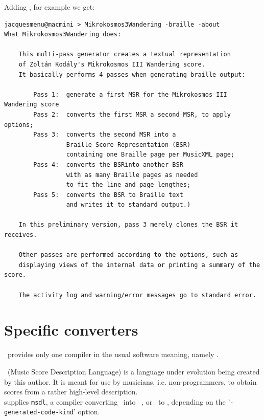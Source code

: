 Adding , for example we get:
\begin{lstlisting}[language=Terminal]
jacquesmenu@macmini > Mikrokosmos3Wandering -braille -about
What Mikrokosmos3Wandering does:

    This multi-pass generator creates a textual representation
    of Zoltán Kodály's Mikrokosmos III Wandering score.
    It basically performs 4 passes when generating braille output:

        Pass 1:  generate a first MSR for the Mikrokosmos III Wandering score
        Pass 2:  converts the first MSR a second MSR, to apply options;
        Pass 3:  converts the second MSR into a
                 Braille Score Representation (BSR)
                 containing one Braille page per MusicXML page;
        Pass 4:  converts the BSRinto another BSR
                 with as many Braille pages as needed
                 to fit the line and page lengthes;
        Pass 5:  converts the BSR to Braille text
                 and writes it to standard output.)

    In this preliminary version, pass 3 merely clones the BSR it receives.

    Other passes are performed according to the options, such as
    displaying views of the internal data or printing a summary of the score.

    The activity log and warning/error messages go to standard error.
\end{lstlisting}


\section{Specific converters}\label{Specific converters}

\mf\ provides only one compiler in the usual software meaning, namely \msdlconverter.

\msdlLang\ (Music Score Description Language) is a language under evolution being created by this author. It is meant for use by musicians, i.e. non-programmers, to obtain scores from a rather high-level description.\\
\mf supplies {\tt msdl}, a compiler converting \msdlLang\ into \guido\, \lily, \braille or \mxml\ to \standardOutput, depending on the '{\tt -generated-code-kind}' option.


